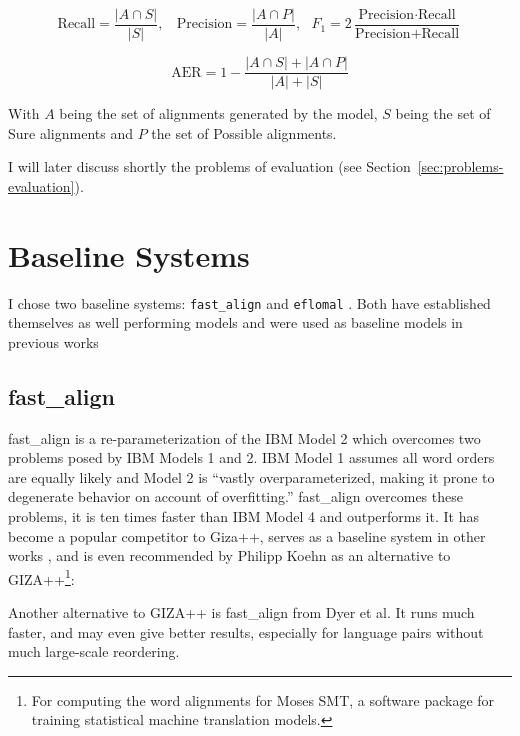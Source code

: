 \[
	\text{Recall} = \frac{|A\cap S|}{|S|},~~~~\text{Precision}  = \frac{|A\cap P|}{|A|},~~~F_1 = 2\frac{\text{Precision}\cdot\text{Recall}}{\text{Precision}+\text{Recall}}
\]

\[
	\text{AER} = 1- \frac{|A\cap S|+|A\cap P|}{|A|+|S|}
\]

With $A$ being the set of alignments generated by the model, $S$ being the set of Sure alignments and $P$ the set of Possible alignments.

I will later discuss shortly the problems of evaluation (see Section~\ref{sec:problems-evaluation}).




\section{Baseline Systems}
I chose two baseline systems: \texttt{fast\_align} \autocite{dyer-etal-2013-simple} and \texttt{eflomal} \autocite{Ostling2016efmaral}. 
Both have established themselves as well performing models and were used as baseline models in previous works \autocites{Ostling2016efmaral,jalili-sabet-etal-2020-simalign,steingrimsson-etal-2021-combalign}

\subsection{fast\_align}
fast\_align is a re-parameterization of the IBM Model 2 which overcomes two problems posed by IBM Models 1 and 2. 
IBM Model 1 assumes all word orders are equally likely and Model 2 is \enquote{vastly overparameterized, making it prone to degenerate behavior on account of overfitting.} \autocite{dyer-etal-2013-simple} 
fast\_align overcomes these problems, it is ten times faster than IBM Model 4 and outperforms it.
It has become a popular competitor to Giza++, serves as a baseline system in other works \autocites{Ostling2016efmaral,jalili-sabet-etal-2020-simalign}, and is even recommended by Philipp Koehn as an alternative to GIZA++\footnote{For computing the word alignments for Moses SMT, a software package for training statistical machine translation models.}:

\begin{displayquote}
Another alternative to GIZA++ is fast\_align from Dyer et al. It runs much faster, and may even give better results, especially for language pairs without much large-scale reordering. \autocite[115]{koehn-moses-smt-2022}
\end{displayquote}
 

